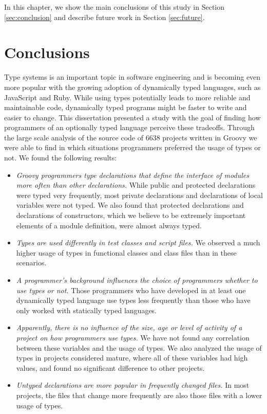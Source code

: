 \documentclass[msc]{ppgccufmg}
\begin{document}
In this chapter, we show the main conclusions of this study in Section \ref{sec:conclusion} and describe future work in Section \ref{sec:future}.

\section{Conclusions\label{sec:conclusion}}
Type systems is an important topic in software engineering and is becoming even more popular with the growing adoption of dynamically typed languages, such as JavaScript and Ruby.
While using types potentially leads to more reliable and maintainable code, dynamically typed programs might be faster to write and easier to change.
This dissertation presented a study with the goal of finding how programmers of an optionally typed language perceive these tradeoffs.
Through the large scale analysis of the source code of 6638 projects written in Groovy we were able to find in which situations programmers preferred the usage of types or not.
We found the following results:

\begin{itemize}
	\item \emph{Groovy programmers type declarations that define the interface of modules more often than other declarations.} 
While public and protected declarations were typed very frequently, most private declarations and declarations of local variables were not typed. We also found that protected declarations and declarations of constructors, which we believe to be extremely important elements of a module definition, were almost always typed.

	\item \emph{Types are used differently in test classes and script files.}  We observed a much higher usage of types in functional classes and class files than in these scenarios.

	\item \emph{A programmer's background influences the choice of programmers whether to use types or not.} Those programmers who have developed in at least one dynamically typed language use types less frequently than those who have only worked with statically typed languages.
	
	\item \emph{Apparently, there is no influence of the size, age or level of activity of a project on how programmers use types.} We have not found any correlation between these variables and the usage of types. We also analyzed the usage of types in projects considered mature, where all of these variables had high values, and found no significant difference to other projects.

	\item \emph{Untyped declarations are more popular in frequently changed files.} In most projects, the files that change more frequently are also those files with a lower usage of types.
\end{itemize}
\end{document}
